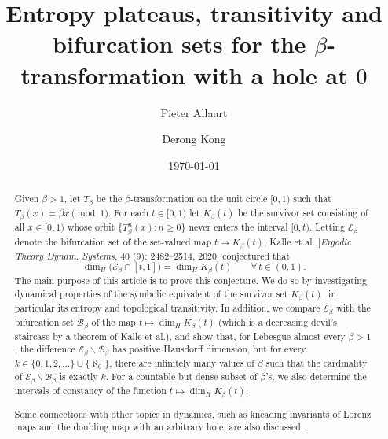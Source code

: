 \documentclass[11pt]{amsart}
\theoremstyle{definition}
\theoremstyle{remark}
\numberwithin{equation}{section}
\newcommand{\BB}{\mathscr{B}}
\newcommand{\EE}{\mathscr{E}}
\begin{document}
\title[The $\beta$-transformation with a hole at $0$]{Entropy plateaus, transitivity and bifurcation sets for the $\beta$-transformation with a hole at $0$}

\author[P. Allaart]{Pieter Allaart}
\address[P. Allaart]{Mathematics Department, University of North Texas, 1155 Union Cir \#311430, Denton, TX 76203-5017, U.S.A.}

\author[D. Kong]{Derong Kong}
\address[D. Kong]{College of Mathematics and Statistics, Mathematical Research Center, Chongqing University, Chongqing 401331, People's Republic of China.}


\date{\today}
\dedicatory{}



\begin{abstract}
Given $\beta{>1}$, let $T_\beta$ be the $\beta$-transformation on the unit circle $[0,1)$ such that $T_\beta(x)=\beta x\pmod 1$. For each $t\in[0,1)$ let $K_\beta(t)$ be the survivor set consisting of all $x\in[0,1)$ whose orbit $\{T^n_\beta(x): n\ge 0\}$ never enters the interval $[0,t)$. Letting $\EE_\beta$ denote the bifurcation set of the set-valued map $t\mapsto K_\beta(t)$, Kalle et al. [{\em Ergodic Theory Dynam. Systems}, 40 (9): 2482--2514, 2020] conjectured that
\[
\dim_H\big(\EE_\beta\cap[t,1]\big)=\dim_H K_\beta(t) \qquad \forall\,t\in(0,1).
\]
The main purpose of this article is to prove this conjecture. We do so by investigating dynamical properties of the symbolic equivalent of the survivor set $K_\beta(t)$, in particular its entropy and topological transitivity. In addition, we compare $\EE_\beta$ with the bifurcation set $\BB_\beta$ of the map $t\mapsto \dim_H K_\beta(t)$ (which is a decreasing devil's staircase by a theorem of Kalle et al.), and show that, for Lebesgue-almost every $\beta{>1}$, the difference $\EE_\beta\backslash\BB_\beta$ has positive Hausdorff dimension, but for every $k\in\{0,1,2,\dots\}\cup\{\aleph_0\}$, there are infinitely many values of $\beta$ such that the cardinality of $\EE_\beta\backslash\BB_\beta$ is exactly $k$. For a countable but dense subset of $\beta$'s, we also determine the intervals of constancy of the function $t\mapsto \dim_H K_\beta(t)$.

Some connections with other topics in dynamics, such as kneading invariants of Lorenz maps and the doubling map with an arbitrary hole, are also discussed.
\end{abstract}
\end{document}
